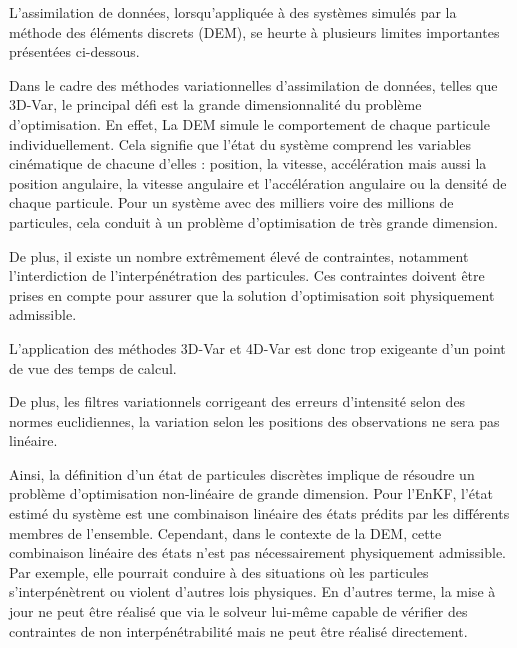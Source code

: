 L'assimilation de données, lorsqu'appliquée à des systèmes simulés par la méthode des éléments discrets (DEM), se heurte à plusieurs limites importantes présentées ci-dessous.

Dans le cadre des méthodes variationnelles d'assimilation de données, telles que 3D-Var, le principal défi est la grande dimensionnalité du problème d'optimisation.
En effet, La DEM simule le comportement de chaque particule individuellement. Cela signifie que l'état du système comprend les variables cinématique de chacune d'elles : position, la vitesse, accélération mais aussi la position angulaire, la vitesse angulaire et l'accélération angulaire ou la densité de chaque particule. Pour un système avec des milliers voire des millions de particules, cela conduit à un problème d'optimisation de très grande dimension.

De plus, il existe un nombre extrêmement élevé de contraintes, notamment l'interdiction de l'interpénétration des particules. Ces contraintes doivent être prises en compte pour assurer que la solution d'optimisation soit physiquement admissible.

L'application des méthodes 3D-Var et 4D-Var est donc trop exigeante d'un point de vue des temps de calcul.

De plus, les filtres variationnels corrigeant des erreurs d'intensité selon des normes euclidiennes, la variation selon les positions des observations ne sera pas linéaire.

Ainsi, la définition d'un état de particules discrètes implique de résoudre un problème d'optimisation non-linéaire de grande dimension.
Pour l'EnKF, l'état estimé du système est une combinaison linéaire des états prédits par les différents membres de l'ensemble. Cependant, dans le contexte de la DEM, cette combinaison linéaire des états n'est pas nécessairement physiquement admissible. Par exemple, elle pourrait conduire à des situations où les particules s'interpénètrent ou violent d'autres lois physiques.
En d'autres terme, la mise à jour ne peut être réalisé que via le solveur lui-même capable de vérifier des contraintes de non interpénétrabilité mais ne peut être réalisé directement.

